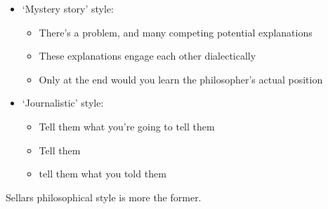 
\begin{itemize}
\item `Mystery story' style:
    \begin{itemize}
        \item There's a problem, and many competing potential explanations
        \item These explanations engage each other dialectically
        \item Only at the end would you learn the philosopher's actual position
    \end{itemize}
\item `Journalistic' style:
    \begin{itemize}
        \item Tell them what you're going to tell them
        \item Tell them
        \item tell them what you told them
    \end{itemize}
\end{itemize}

Sellars philosophical style is more the former.